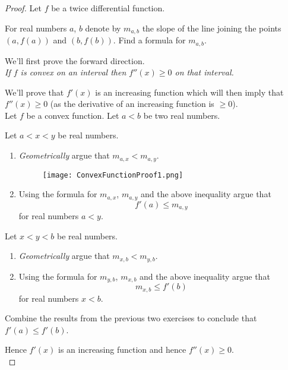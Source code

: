 \begin{proof}
	Let $f$ be a twice differential function.
	\begin{exercise}
		For real numbers $a$, $b$ denote by $m_{a,b}$ the slope of the line joining the points $(a,f(a))$ and $(b,f(b))$.
		Find a formula for $m_{a,b}$.
	\end{exercise}

	\noindent We'll first prove the forward direction.\\
	 {\it 	If $f$ is convex on an interval then $f''(x) \ge 0$ on that interval.}

	We'll prove that $f'(x)$ is an increasing function which will then imply that $f''(x) \ge 0$ (as the derivative of an increasing function is $\ge 0$).\\

	Let $f$ be a convex function. Let $a < b$ be two real numbers.
	\begin{exercise}
		Let $a < x < y$ be real numbers.
		\begin{enumerate}
			\item {\it Geometrically} argue that $m_{a,x} < m_{a,y}$.
			\begin{figure}[H]
				\centering
				\texttt{[image: ConvexFunctionProof1.png]}
			\end{figure}
			\item Using the formula for $m_{a,x}$, $m_{a,y}$ and the above inequality argue that $$f'(a) \le m_{a,y}$$ for real numbers $a < y$.
		\end{enumerate}
	\end{exercise}

	\begin{exercise}
		Let $x < y < b$ be real numbers.
		\begin{enumerate}
			\item {\it Geometrically} argue that $m_{x,b} < m_{y,b}$.
			\item Using the formula for $m_{y,b}$, $m_{x,b}$ and the above inequality argue that $$m_{x,b} \le f'(b) $$ for real numbers $x < b$.
		\end{enumerate}
	\end{exercise}

	\begin{exercise}
		Combine the results from the previous two exercises to conclude that $f'(a) \le f'(b)$.
	\end{exercise}
	Hence $f'(x)$ is an increasing function and hence $f''(x) \ge 0$.\\


\end{proof}
